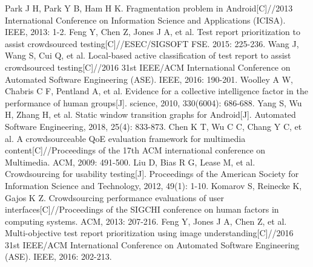 \documentclass[conference]{IEEEtran}
\begin{document}







\begin{thebibliography}{00}
 Park J H, Park Y B, Ham H K. Fragmentation problem in Android[C]//2013 International Conference on Information Science and Applications (ICISA). IEEE, 2013: 1-2.
 Feng Y, Chen Z, Jones J A, et al. Test report prioritization to assist crowdsourced testing[C]//ESEC/SIGSOFT FSE. 2015: 225-236.
 Wang J, Wang S, Cui Q, et al. Local-based active classification of test report to assist crowdsourced testing[C]//2016 31st IEEE/ACM International Conference on Automated Software Engineering (ASE). IEEE, 2016: 190-201.
 Woolley A W, Chabris C F, Pentland A, et al. Evidence for a collective intelligence factor in the performance of human groups[J]. science, 2010, 330(6004): 686-688.
 Yang S, Wu H, Zhang H, et al. Static window transition graphs for Android[J]. Automated Software Engineering, 2018, 25(4): 833-873.
 Chen K T, Wu C C, Chang Y C, et al. A crowdsourceable QoE evaluation framework for multimedia content[C]//Proceedings of the 17th ACM international conference on Multimedia. ACM, 2009: 491-500.
 Liu D, Bias R G, Lease M, et al. Crowdsourcing for usability testing[J]. Proceedings of the American Society for Information Science and Technology, 2012, 49(1): 1-10.
 Komarov S, Reinecke K, Gajos K Z. Crowdsourcing performance evaluations of user interfaces[C]//Proceedings of the SIGCHI conference on human factors in computing systems. ACM, 2013: 207-216.
 Feng Y, Jones J A, Chen Z, et al. Multi-objective test report prioritization using image understanding[C]//2016 31st IEEE/ACM International Conference on Automated Software Engineering (ASE). IEEE, 2016: 202-213.
\end{thebibliography}
\end{document}
